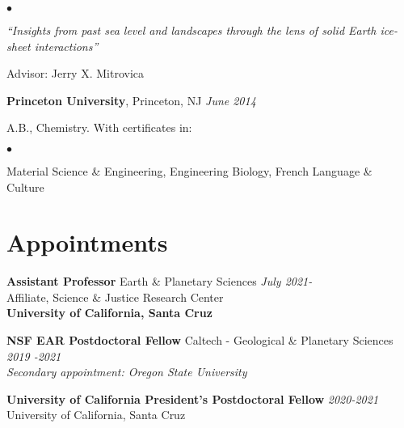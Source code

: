 \documentclass[margin,line]{res}
\newenvironment{list1}{
  \begin{list}{\ding{113}}{%
      \setlength{\itemsep}{0in}
      \setlength{\parsep}{0in} \setlength{\parskip}{0in}
      \setlength{\topsep}{0in} \setlength{\partopsep}{0in} 
      \setlength{\leftmargin}{0.00in}}}{\end{list}}
\newenvironment{list2}{
  \begin{list}{$\bullet$}{%
      \setlength{\itemsep}{0in}
      \setlength{\parsep}{0in} \setlength{\parskip}{0in}
      \setlength{\topsep}{0in} \setlength{\partopsep}{0in} 
      \setlength{\leftmargin}{0.00in}}}{\end{list}}
\begin{document}
\begin{resume}
\begin{list1}
\begin{list2}
\item[] {\em``Insights from past sea level and landscapes through the lens of solid Earth ice-sheet interactions''} \\
\item[] Advisor:  Jerry X. Mitrovica
\end{list2}
\vspace*{.05in}
\end{list1}


{\bf Princeton University}, Princeton, NJ \hfill {\em June 2014}  \\
\vspace*{-.1in}
\begin{list1}
\item[] A.B., Chemistry. With certificates in:
\begin{list2}
\item[] Material Science \& Engineering, Engineering Biology, French Language \& Culture

\end{list2}
\end{list1}


\section{\sc Appointments}


\vspace{0.2 cm}

{\bf Assistant Professor } Earth \& Planetary Sciences \hfill {\em July 2021-}\\
Affiliate, Science \& Justice Research Center \\
{\bf University of California, Santa Cruz}


{\bf NSF EAR Postdoctoral Fellow }Caltech - Geological \& Planetary Sciences \hfill {\em 2019 -2021}\\
{\em Secondary appointment: Oregon State University }

{\bf University of California President's Postdoctoral Fellow }  \hfill {\em 2020-2021}\\
University of California, Santa Cruz 



\end{resume}
\end{document}
